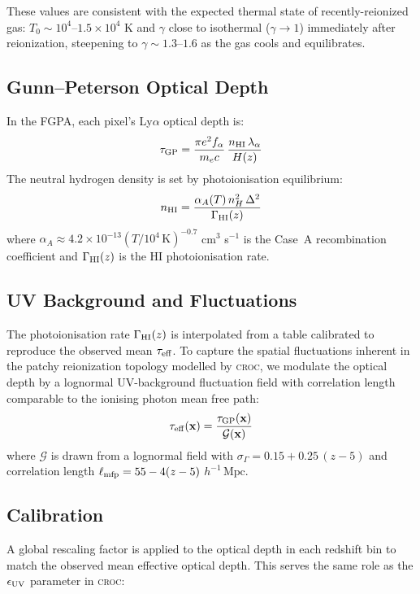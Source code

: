\documentclass[11pt]{article}
\newcommand{\Mpch}{h^{-1}\,\text{Mpc}}
\newcommand{\taueff}{\tau_{\rm eff}}
\newcommand{\croc}{\textsc{croc}}
\begin{document}
These values are consistent with the expected thermal state of recently-reionized gas: $T_0 \sim 10^4$--$1.5\times10^4$ K and $\gamma$ close to isothermal ($\gamma \to 1$) immediately after reionization, steepening to $\gamma \sim 1.3$--$1.6$ as the gas cools and equilibrates.

\subsection{Gunn--Peterson Optical Depth}

In the FGPA, each pixel's Ly$\alpha$ optical depth is:
\begin{equation}
    \tau_{\rm GP} = \frac{\pi e^2 f_\alpha}{m_e c}\,\frac{n_{\rm HI}\,\lambda_\alpha}{H(z)}
\end{equation}
The neutral hydrogen density is set by photoionisation equilibrium:
\begin{equation}
    n_{\rm HI} = \frac{\alpha_A(T)\,n_H^2\,\Delta^2}{\Gamma_{\rm HI}(z)}
\end{equation}
where $\alpha_A \approx 4.2\times10^{-13}(T/10^4\,\text{K})^{-0.7}$ cm$^3$ s$^{-1}$ is the Case~A recombination coefficient and $\Gamma_{\rm HI}(z)$ is the HI photoionisation rate.

\subsection{UV Background and Fluctuations}

The photoionisation rate $\Gamma_{\rm HI}(z)$ is interpolated from a table calibrated to reproduce the observed mean $\taueff$. To capture the spatial fluctuations inherent in the patchy reionization topology modelled by \croc{}, we modulate the optical depth by a lognormal UV-background fluctuation field with correlation length comparable to the ionising photon mean free path:
\begin{equation}
    \tau_{\rm eff}(\mathbf{x}) = \frac{\tau_{\rm GP}(\mathbf{x})}{\mathcal{G}(\mathbf{x})}
\end{equation}
where $\mathcal{G}$ is drawn from a lognormal field with $\sigma_\Gamma = 0.15 + 0.25\,(z-5)$ and correlation length $\ell_{\rm mfp} = 55 - 4(z-5)$ $\Mpch$.

\subsection{Calibration}

A global rescaling factor is applied to the optical depth in each redshift bin to match the observed mean effective optical depth. This serves the same role as the $\epsilon_{\rm UV}$ parameter in \croc{}:
\end{document}
